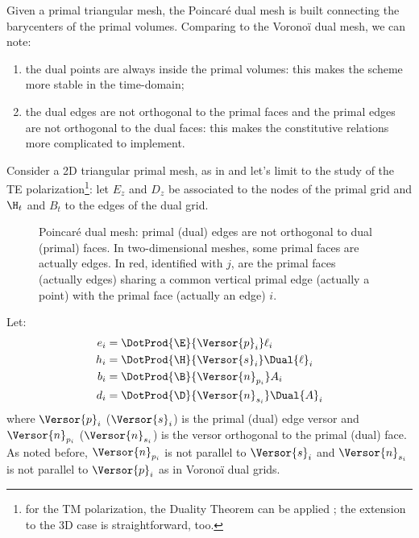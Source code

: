 Given a primal triangular mesh, the Poincar\'e dual mesh is built
connecting the barycenters of the primal volumes. Comparing to the
Vorono\"i dual mesh, we can note:
\begin{enumerate}
\item
  the dual points are always inside the primal volumes: this makes the
  scheme more stable in the time-domain;
\item
  the dual edges are not orthogonal to the primal faces and the primal
  edges are not orthogonal to the dual faces: this makes the
  constitutive relations more complicated to implement.
\end{enumerate}

Consider a 2D triangular primal mesh, as in  and
let's limit to the study of the TE polarization\footnote{for the TM
polarization, the Duality Theorem can be applied
\cite{someda_electromagnetic}; the extension to the 3D case is
straightforward, too.}: let $E_z$ and $D_z$ be associated to the nodes
of the primal grid and $\H_t$ and $B_t$ to the edges of the dual grid.

\begin{figure}[htbp]
  \begin{center}
    \resizebox{4cm}{!}{}
  \end{center}
  \caption{Poincar\'e dual mesh: primal (dual) edges are not
    orthogonal to dual (primal) faces. In two-dimensional meshes, some
    primal faces are actually edges. In red, identified with $j$, are
    the primal faces (actually edges) sharing a common vertical primal
    edge (actually a point) with the primal face (actually an edge)
    $i$.}
  \label{fig:poincare}
\end{figure}

Let:
\begin{align} \label{eqn:dof_poincare}
e_i & = \DotProd{\E}{\Versor{p}_i} \ell_i \\
h_i & = \DotProd{\H}{\Versor{s}_i} \Dual{\ell}_i \\
b_i & = \DotProd{\B}{\Versor{n}_{p_i}} A_i \\
d_i & = \DotProd{\D}{\Versor{n}_{s_i}} \Dual{A}_i
\end{align}
where $\Versor{p}_i$ ($\Versor{s}_i$) is the primal (dual) edge
versor and $\Versor{n}_{p_i}$ ($\Versor{n}_{s_i}$) is the versor
orthogonal to the primal (dual) face. As noted before,
$\Versor{n}_{p_i}$ is not parallel to $\Versor{s}_i$ and
$\Versor{n}_{s_i}$ is not parallel to $\Versor{p}_i$ as in
Vorono\"i dual grids.

